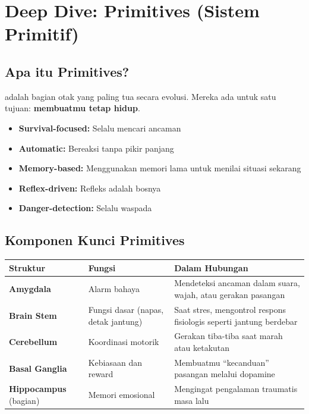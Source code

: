 \section{Deep Dive: Primitives (Sistem Primitif)}

\subsection{Apa itu Primitives?}

 adalah bagian otak yang paling tua secara evolusi. Mereka ada untuk satu tujuan: \textbf{membuatmu tetap hidup}.

\begin{praktikbox}
\begin{itemize}
    \item \textbf{Survival-focused:} Selalu mencari ancaman
    \item \textbf{Automatic:} Bereaksi tanpa pikir panjang
    \item \textbf{Memory-based:} Menggunakan memori lama untuk menilai situasi sekarang
    \item \textbf{Reflex-driven:} Refleks adalah bosnya
    \item \textbf{Danger-detection:} Selalu waspada
\end{itemize}
\end{praktikbox}

\subsection{Komponen Kunci Primitives}

\begin{center}
\renewcommand{\arraystretch}{1.5}
\begin{tabular}{|>{\raggedright}p{3.5cm}|>{\raggedright}p{5cm}|>{\raggedright\arraybackslash}p{6.5cm}|}
\hline
\rowcolor{accent!20}
\textbf{Struktur} & \textbf{Fungsi} & \textbf{Dalam Hubungan} \\
\hline
\textbf{Amygdala} & Alarm bahaya & Mendeteksi ancaman dalam suara, wajah, atau gerakan pasangan \\
\hline
\textbf{Brain Stem} & Fungsi dasar (napas, detak jantung) & Saat stres, mengontrol respons fisiologis seperti jantung berdebar \\
\hline
\textbf{Cerebellum} & Koordinasi motorik & Gerakan tiba-tiba saat marah atau ketakutan \\
\hline
\textbf{Basal Ganglia} & Kebiasaan dan reward & Membuatmu ``kecanduan'' pasangan melalui dopamine \\
\hline
\textbf{Hippocampus} (bagian) & Memori emosional & Mengingat pengalaman traumatis masa lalu \\
\hline
\end{tabular}
\end{center}

